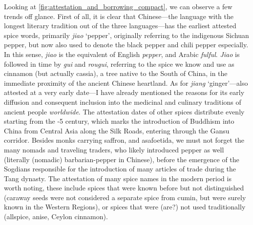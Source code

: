 Looking at \cref{fig:attestation_and_borrowing_compact}, we can observe a few trends off glance. First of all, it is clear that Chinese---the language with the longest literary tradition out of the three languages---has the earliest attested spice words, primarily \textit{jiao} `pepper', originally referring to the indigenous Sichuan pepper, but now also used to denote the black pepper and chili pepper especially. In this sense, \textit{jiao} is the equivalent of English \textit{pepper}, and Arabic \textit{fulful}. \textit{Jiao} is followed in time by \textit{gui} and \textit{rougui}, referring to the spice we know and use as cinnamon (but actually cassia), a tree native to the South of China, in the immediate proximity of the ancient Chinese heartland. As for \textit{jiang} `ginger'---also attested at a very early date---I have already mentioned the reasons for its early diffusion and consequent inclusion into the medicinal and culinary traditions of ancient people \textit{worldwide}. The attestation dates of other spices distribute evenly starting from the -{5} century, which marks the introduction of Buddhism into China from Central Asia along the Silk Roads, entering through the Gansu corridor. Besides monks carrying saffron, and asafoetida, we must not forget the many nomads and traveling traders, who likely introduced pepper as well (literally (nomadic) barbarian-pepper in Chinese), before the emergence of the Sogdians responsible for the introduction of many articles of trade during the Tang dynasty. 
The attestation of many spice names in the modern period is worth noting, these include spices that were known before but not distinguished (caraway seeds were not considered a separate spice from cumin, but were surely known in the Western Regions), or spices that were (are?) not used traditionally (allspice, anise, Ceylon cinnamon).


